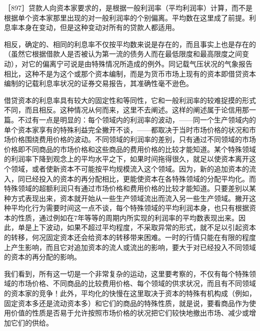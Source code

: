 ［897］贷款人向资本家要求的，是根据一般利润率（平均利润率）计算，而不是根据单个资本家那里出现的对一般利润率的个别偏离。平均数在这里成了前提。利息率本身在变动，但是这种变动对所有的贷款人都适用。

相反，确定的、相同的利息率不仅按平均数来说是存在的，而且事实上也是存在的（虽然它根据借款人是否被认为第一流的债务人而在最低限度和最高限度之间变动），对它的偏离宁可说是由特殊情况所造成的例外。同记载气压状况的气象报告相比，这种不是为这个或那个资本编制，而是为货币市场上现有的资本即借贷资本编制的记载利息率状况的证券交易报告，其准确性毫不逊色。

借贷资本的利息率具有较大的固定性和等同性，它和一般利润率的较难捉摸的形式不同，而且相反。这种情况从何而来，这里不去阐述。这样的阐述属于论信用那一篇。不过有一点是明显的：每个领域内的利润率的波动，——同一个生产领域内的单个资本家享有的特殊利益完全撇开不谈，——都取决于当时市场价格的状况和市场价格围绕费用价格的波动。不同领域的利润率的差别，只有通过不同领域的市场价格即不同商品的市场价格和这些商品的费用价格的比较才能知道。某个特殊领域的利润率下降到观念上的平均水平之下，如果时间拖得很久，就足以使资本离开这个领域，或者使新资本不可能按平均规模流入这个领域。因为，新的追加资本的流入，同已经投入的资本的再分配相比，更能使资本在各特殊领域的分配平均化。而特殊领域的超额利润只有通过市场价格和费用价格的比较才能知道。只要差别以某种方式表现出来，资本就开始从一些生产领域流出而流入另一些生产领域。撇开这种平均化行为需要时间这一点不谈，每个特殊领域的平均利润本身，也只有根据资本的性质，通过例如在7年等等的周期内所实现的利润率的平均数表现出来。因此，单是上下波动，如果不超过平均程度，不采取异常的形式，就不足以引起资本的转移，何况固定资本还会给资本的转移带来困难。一时的行情只能在有限的程度上产生影响，而且它对追加资本的流人或流出的影响，要大于对已经投入不同领域的资本的再分配的影响。

我们看到，所有这一切是一个非常复杂的运动，这里要考察的，不仅有每个特殊领域的市场价格、不同商品的比较费用价格、每个领域的供求状况，而且有不同领域的资本家的竞争！此外，平均化的快慢在这里取决于资本的特殊有机构成（例如，固定资本多还是流动资本多）和它们的商品的特殊性质，就是说，要看商品作为使用价值的性质是否易于允许按照市场价格的状况把它们较快地撤出市场、减少或增加它们的供给。

